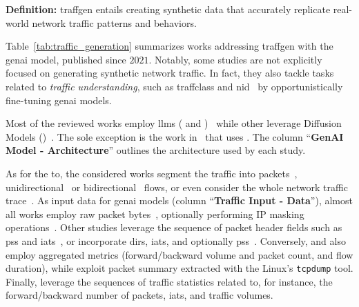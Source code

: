 


\noindent
\textbf{Definition:} \gls{traffgen} entails creating synthetic data that accurately replicate real-world network traffic patterns and behaviors.

Table~\ref{tab:traffic_generation} summarizes works addressing \gls{traffgen} with the \gls{genai} model, published since $2021$.
Notably, some studies are not explicitly focused on generating synthetic network traffic.
%
In fact, they also tackle tasks related to \emph{traffic understanding}, such as \gls{traffclass} and \gls{nid}~\cite{meng2023netgpt, wang2024lens, qu2024trafficgpt} by opportunistically fine-tuning \gls{genai} models.
%

Most of the reviewed works employ \glspl{llm} (\eg {} and )~\cite{bikmukhamedov2021, meng2023netgpt, Kholgh2023PACGPT, wang2024lens, qu2024trafficgpt} while other leverage Diffusion Models (\eg {})~\cite{sivaroopan2023netdiffus, jiang2024netdiffusion, zhang2024netdiff}.
%
The sole exception is the work in~\cite{chu2024mamba} that uses .
%
The column ``\textbf{GenAI Model - Architecture}'' outlines the architecture used by each study.

%
As for the
\gls{to}, the considered works segment the traffic into packets~\cite{meng2023netgpt,qu2024trafficgpt}, unidirectional~\cite{meng2023netgpt,Kholgh2023PACGPT,wang2024lens,qu2024trafficgpt, chu2024mamba, wolf2024} or bidirectional~\cite{bikmukhamedov2021, jiang2024netdiffusion, zhang2024netdiff} flows, or even consider the whole network traffic trace~\cite{sivaroopan2023netdiffus}.
As input data for \gls{genai} models (column ``\textbf{Traffic Input - Data}''), almost all works employ raw packet bytes~\cite{meng2023netgpt,jiang2024netdiffusion,wang2024lens,qu2024trafficgpt, chu2024mamba}, optionally performing IP masking operations~\cite{jiang2024netdiffusion,wang2024lens,qu2024trafficgpt}. 
%
Other studies leverage the sequence of packet header fields such as \glspl{ps} and \glspl{iat}~\cite{bikmukhamedov2021}, or incorporate \glspl{dir}, \glspl{iat}, and optionally \glspl{ps}~\cite{sivaroopan2023netdiffus}.
%
Conversely, \citet{sivaroopan2023netdiffus} and \citet{wolf2024} also employ aggregated metrics (\eg forward/backward volume and packet count, and flow duration), while \citet{Kholgh2023PACGPT} exploit packet summary extracted with the Linux's \texttt{tcpdump} tool. 
Finally, \citet{zhang2024netdiff} leverage the sequences of traffic statistics related to, for instance, the forward/backward number of packets, \glspl{iat}, and traffic volumes.
%

